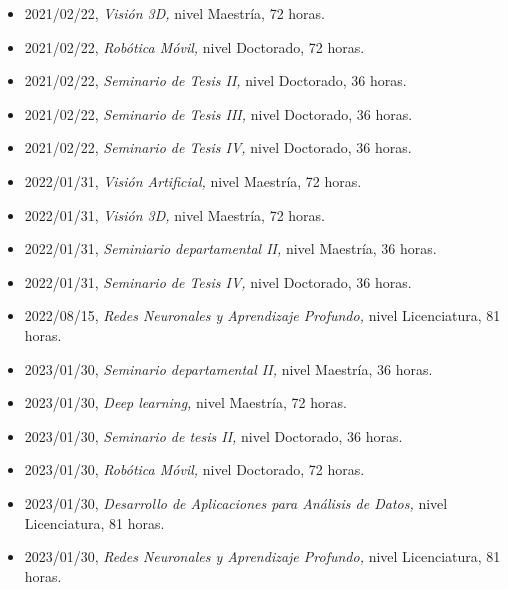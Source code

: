 \begin{itemize} 
\item 2021/02/22, \textit{ Visión 3D,} nivel Maestría, 72 horas. 
\item 2021/02/22, \textit{ Robótica Móvil,} nivel Doctorado, 72 horas. 
\item 2021/02/22, \textit{ Seminario de Tesis II,} nivel Doctorado, 36 horas. 
\item 2021/02/22, \textit{ Seminario de Tesis III,} nivel Doctorado, 36 horas. 
\item 2021/02/22, \textit{ Seminario de Tesis IV,} nivel Doctorado, 36 horas. 
\item 2022/01/31, \textit{ Visión Artificial,} nivel Maestría, 72 horas. 
\item 2022/01/31, \textit{ Visión 3D,} nivel Maestría, 72 horas. 
\item 2022/01/31, \textit{ Seminiario departamental II,} nivel Maestría, 36 horas. 
\item 2022/01/31, \textit{ Seminario de Tesis IV,} nivel Doctorado, 36 horas. 
\item 2022/08/15, \textit{ Redes Neuronales y Aprendizaje Profundo,} nivel Licenciatura, 81 horas. 
\item 2023/01/30, \textit{ Seminario departamental II,} nivel Maestría, 36 horas. 
\item 2023/01/30, \textit{ Deep learning,} nivel Maestría, 72 horas. 
\item 2023/01/30, \textit{ Seminario de tesis II,} nivel Doctorado, 36 horas. 
\item 2023/01/30, \textit{ Robótica Móvil,} nivel Doctorado, 72 horas. 
\item 2023/01/30, \textit{ Desarrollo de Aplicaciones para Análisis de Datos,} nivel Licenciatura, 81 horas. 
\item 2023/01/30, \textit{ Redes Neuronales y Aprendizaje Profundo,} nivel Licenciatura, 81 horas. 
\end{itemize} 

